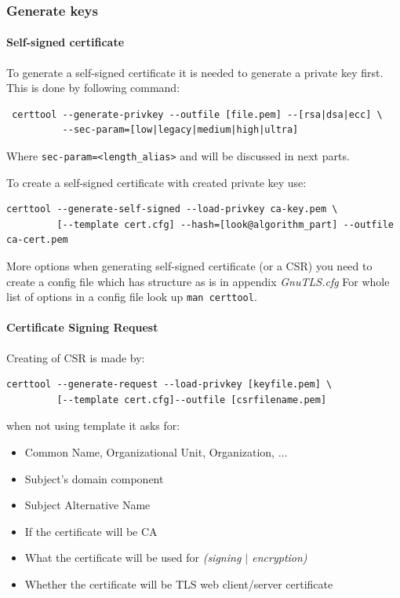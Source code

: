 \documentclass[10pt, a4paper]{report}
\begin{document}
    \subsubsection{Generate keys}
    
      \paragraph{Self-signed certificate}
To generate a self-signed certificate it is needed to generate a private key first. This is done by following command:
\begin{verbatim}
 certtool --generate-privkey --outfile [file.pem] --[rsa|dsa|ecc] \
          --sec-param=[low|legacy|medium|high|ultra]
\end{verbatim}
Where \verb+sec-param=<length_alias>+ and will be discussed in next parts.

To create a self-signed certificate with created private key use:
\begin{verbatim}
certtool --generate-self-signed --load-privkey ca-key.pem \
         [--template cert.cfg] --hash=[look@algorithm_part] --outfile ca-cert.pem
\end{verbatim}

More options when generating self-signed certificate (or a CSR) you need to create a config file which has structure as is in appendix \textit{GnuTLS.cfg} 
For whole list of options in a config file look up \verb+man certtool+.
      
\paragraph{Certificate Signing Request}
Creating of CSR is made by:
\begin{verbatim}
certtool --generate-request --load-privkey [keyfile.pem] \
         [--template cert.cfg]--outfile [csrfilename.pem]
\end{verbatim}

when not using template it asks for:
\begin{itemize}
\item Common Name, Organizational Unit, Organization, ...
\item Subject's domain component
\item Subject Alternative Name
\item If the certificate will be CA
\item What the certificate will be used for \textit{(signing $\vert$ encryption)}
\item Whether the certificate will be TLS web client/server certificate
\end{itemize}
\end{document}
